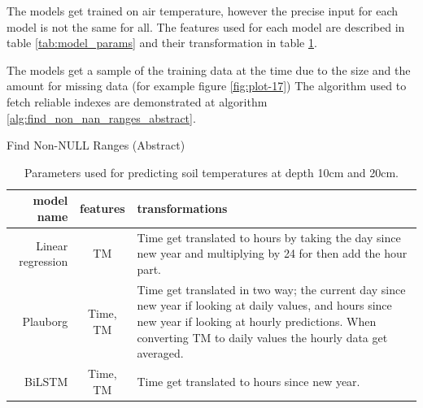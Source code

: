 The models get trained on air temperature, however the precise input for each model is not the same for all. The features used for each model are described in table \ref{tab:model_params} and their transformation in table \ref{tab:model_trans}.

The models get a sample of the training data at the time due to the size and the amount for missing data (for example figure \ref{fig:plot-17}) The algorithm used to fetch reliable indexes are demonstrated at algorithm \ref{alg:find_non_nan_ranges_abstract}.

\begin{algorithm}
	\caption{Find Non-NULL Ranges (Abstract)}
	\label{alg:find_non_nan_ranges_abstract}
	
	
	\BlankLine
	
\end{algorithm}


\begin{table}[H]
	\centering
	\begin{tabular}{|r|c| p{6cm}|}
		\hline model name & features & transformations \\\hline\hline
		Linear regression & TM & Time get translated to hours by taking the day since new year and multiplying by 24 for then add the hour part. \\\hline
		Plauborg & Time, TM & Time get translated in two way; the current day since new year if looking at daily values, and hours since new year if looking at hourly predictions. When converting TM to daily values the hourly data get averaged. \\\hline
		BiLSTM &Time, TM& Time get translated to hours since new year.\\\hline
	\end{tabular}
	\caption[Model parameters]{Parameters used for predicting soil temperatures at depth 10cm and 20cm.}
	\label{tab:model_trans}
\end{table}

